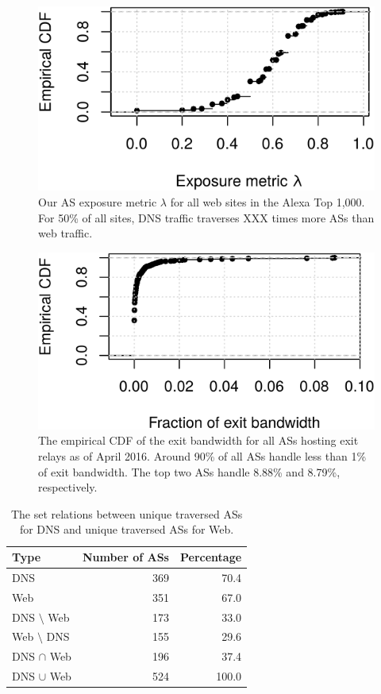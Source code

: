 \begin{figure}[t]
	\centering
	\includegraphics[width=0.75\linewidth]{figures/dns-exposure.pdf}
	\caption{Our AS exposure metric $\lambda$ for all web sites in the Alexa Top
	1,000.  For 50\% of all sites, DNS traffic traverses XXX times more ASs than
	web traffic.}
	\label{fig:exposure}
\end{figure}

\begin{figure}[t]
	\centering
	\includegraphics[width=0.75\linewidth]{figures/exitbw-per-as.pdf}
	\caption{The empirical CDF of the exit bandwidth for all ASs hosting exit
	relays as of April 2016.  Around 90\% of all ASs handle less than 1\% of
	exit bandwidth.  The top two ASs handle 8.88\% and 8.79\%, respectively.}
	\label{fig:exitbw-as}
\end{figure}

\begin{table}[t]
	\centering
	\begin{tabular}{l r r}
	\toprule
	\textbf{Type} & \textbf{Number of ASs} & \textbf{Percentage} \\
	\midrule
	DNS & 369 & 70.4 \\
	Web & 351 & 67.0 \\
	DNS $\setminus$ Web & 173 & 33.0 \\
	Web $\setminus$ DNS & 155 & 29.6 \\
	DNS $\cap$ Web & 196 & 37.4 \\
	DNS $\cup$ Web & 524 & 100.0 \\
	\bottomrule
	\end{tabular}
	\caption{The set relations between unique traversed ASs for DNS and unique
	traversed ASs for Web.}
	\label{tab:traversed-ass}
\end{table}

